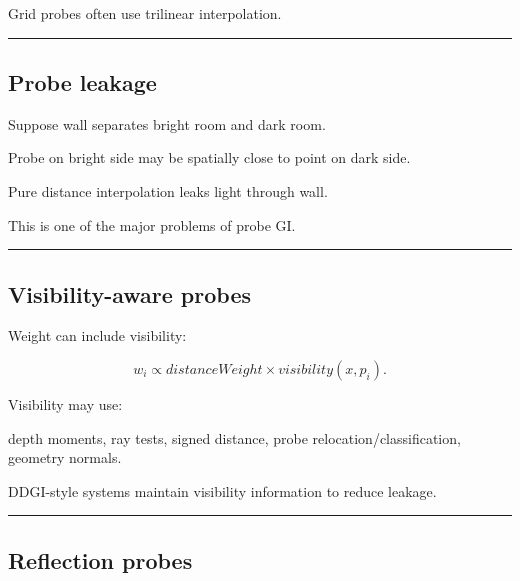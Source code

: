 Grid probes often use trilinear interpolation.

\begin{center}\rule{0.5\linewidth}{0.5pt}\end{center}

\subsection{Probe leakage}\label{04-visual-computing-ii-ch040-probe-leakage}

\hypertarget{04-visual-computing-ii-ch040-probe-leakage}{}

Suppose wall separates bright room and dark room.

Probe on bright side may be spatially close to point on dark side.

Pure distance interpolation leaks light through wall.

This is one of the major problems of probe GI.

\begin{center}\rule{0.5\linewidth}{0.5pt}\end{center}

\subsection{Visibility-aware probes}\label{04-visual-computing-ii-ch040-visibility-aware-probes}

\hypertarget{04-visual-computing-ii-ch040-visibility-aware-probes}{}

Weight can include visibility:

\[
w_i
\propto
distanceWeight
\times
visibility(x,p_i).
\]

Visibility may use:

depth moments, ray tests, signed distance, probe relocation/classification, geometry normals.

DDGI-style systems maintain visibility information to reduce leakage.

\begin{center}\rule{0.5\linewidth}{0.5pt}\end{center}

\subsection{Reflection probes}\label{04-visual-computing-ii-ch040-reflection-probes}

\hypertarget{04-visual-computing-ii-ch040-reflection-probes}{}

